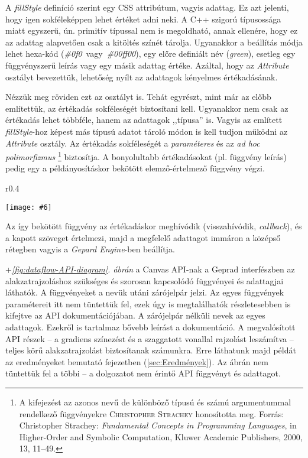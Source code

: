 \documentclass[12pt]{report}
\makeatletter
\theoremstyle{definition}
\newcommand{\inenglish}[1]{\textsl{#1}}
\newcommand{\func}[1]{{\textsl{#1}}}
\newcommand{\melyikoldalra}{r}
\newlength{\Xoffset}
\newlength{\Yoffset}
\newcommand*{\setpdfoffset}[2]{%
  \setlength{\Xoffset}{#1}%
  \setlength{\Yoffset}{#2}%
}
\newcommand*{\setviewport}[4]{%
  \def\x@viewport{%
    {\the\dimexpr#1-\Xoffset}
    {\the\dimexpr#2-\Yoffset}
    {\the\dimexpr#3-\Xoffset}
    {\the\dimexpr#4-\Yoffset}%
  }%
}
\newcommand{\includegraphicskivagas}[6]{
    \setpdfoffset{0pt}{0pt}
    \setviewport{#1}{#2}{#3}{#4}
    \texttt{[image: \#6]}
}
\newcommand{\includedataflowkivagas}[5]{
    \includegraphicskivagas{#1}{#2}{#3}{#4}{scale=0.6,#5}
    {img/built/dataflow_eps}
}
\makeatother
\begin{document}
A \func{fillStyle} definíció szerint egy CSS attribútum, vagyis adattag. Ez azt
jelenti, hogy igen sokféleképpen lehet értéket adni neki. A C++ szigorú
típusossága miatt egyszerű, ún. primitív típussal nem is megoldható, annak
ellenére, hogy ez az adattag alapvetően csak a kitöltés színét tárolja.
Ugyanakkor a beállítás módja lehet hexa-kód
(\func{\#0f0}~vagy~\func{\#00ff00}), egy előre definiált név (\func{green}),
esetleg egy függvényszerű leírás vagy egy másik adattag értéke. Azáltal, hogy
az \func{Attribute} osztályt bevezettük, lehetőség nyílt az adattagok kényelmes
értékadásának.

Nézzük meg röviden ezt az osztályt is. Tehát egyrészt,
mint már az előbb említettük, az értékadás sokféleségét biztosítani
kell. Ugyanakkor nem csak az értékadás lehet többféle, hanem az adattagok
,,típusa'' is. Vagyis az említett \func{fillStyle}-hoz képest más típusú adatot
tároló módon is kell tudjon működni az \func{Attribute} osztály. Az
értékadás sokféleségét a \emph{paraméteres} és az \emph{ad hoc polimorfizmus}
\footnote{A kifejezést az azonos nevű de különböző típusú és számú
argumentummal rendelkező függvényekre \textsc{Christopher Strachey} honosította
meg. Forrás: Christopher Strachey: \emph{Fundamental Concepts in Programming
Languages}, in Higher-Order and Symbolic Computation, Kluwer Academic
Publishers, 2000, 13, 11–49.} biztosítja. A bonyolultabb értékadásokat (pl.
függvény leírás) pedig egy a példányosításkor bekötött elemző-értelmező
függvény végzi.
  \begin{wrapfigure}{\melyikoldalra}{0.4\textwidth}
    \begin{center}
      \includedataflowkivagas{0pt}{210pt}{160pt}{590pt}{}
    \end{center} \caption{\label{fig:dataflow-API-diagram} A \emph{felső} réteg
    (Gepard interfész) függvényei és adattagjai \\ (Részlet
    \az+\emph{\ref{appendix:dataflow}. folyamatábrából}.)}
  \end{wrapfigure}
Az így bekötött függvény az értékadáskor meghívódik (visszahívódik,
\inenglish{callback}), és a kapott szöveget értelmezi, majd a megfelelő
adattagot immáron a középső rétegben vagyis a \func{Gepard Engine}-ben
beállítja.

\Az+\emph{\ref{fig:dataflow-API-diagram}. ábrán} a Canvas API-nak a Geprad
interfészben az alakzatrajzoláshoz szükséges és szorosan kapcsolódó függvényei
és adattagjai láthatók. A függvényeket a nevük utáni zárójelpár jelzi. Az egyes
függvények paramétereit itt nem tüntettük fel, ezek úgy is megtalálhatók
részletesebben is kifejtve az API dokumentációjában. A zárójelpár nélküli nevek
az egyes adattagok. Ezekről is tartalmaz bővebb leírást a dokumentáció. A
megvalósított API részek -- a gradiens színezést és a szaggatott vonallal
rajzolást leszámítva -- teljes körű alakzatrajzolást biztosítanak számunkra.
Erre láthatunk majd példát az eredményeket bemutató fejezetben
(\ref{sec:Eredmények}). Az ábrán nem tüntettük fel a többi -- a dolgozatot nem
érintő API függvényt és adattagot.
\end{document}
